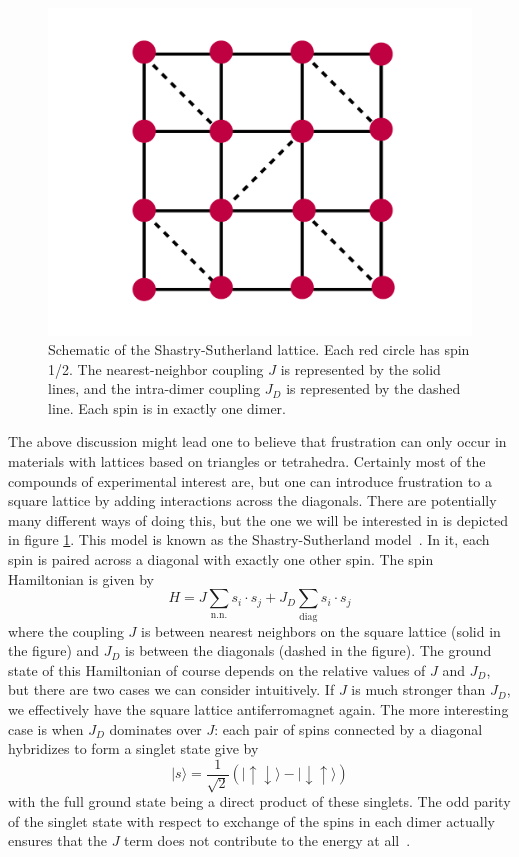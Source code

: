 \documentclass{thesis-umich}
\begin{document}
\begin{figure}
	\caption[The Shastry-Sutherland lattice]{Schematic of the Shastry-Sutherland lattice. Each red circle has spin 1/2. The nearest-neighbor coupling $J$ is represented by the solid lines, and the intra-dimer coupling $J_D$ is represented by the dashed line. Each spin is in exactly one dimer.}
	\label{fig:shastry-sutherland}
	\includegraphics[width=\columnwidth]{figures/ss-model.pdf}
\end{figure}

The above discussion might lead one to believe that frustration can only occur in materials with lattices based on triangles or tetrahedra. Certainly most of the compounds of experimental interest are, but one can introduce frustration to a square lattice by adding interactions across the diagonals. There are potentially many different ways of doing this, but the one we will be interested in is depicted in figure \ref{fig:shastry-sutherland}. This model is known as the Shastry-Sutherland model~\cite{Kageyama2005}. In it, each spin is paired across a diagonal with exactly one other spin. The spin Hamiltonian is given by
\[H = J \sum_{\mathrm{n.n.}}s_i \cdot s_j + J_D\sum_{\mathrm{diag}}s_i \cdot s_j\]
where the coupling $J$ is between nearest neighbors on the square lattice (solid in the figure) and $J_D$ is between the diagonals (dashed in the figure). The ground state of this Hamiltonian of course depends on the relative values of $J$ and $J_D$, but there are two cases we can consider intuitively. If $J$ is much stronger than $J_D$, we effectively have the square lattice antiferromagnet again. The more interesting case is when $J_D$ dominates over $J$: each pair of spins connected by a diagonal hybridizes to form a singlet state give by
\[ | s \rangle = \frac{1}{\sqrt{2}}(|\uparrow \downarrow \rangle - | \downarrow \uparrow \rangle) \]
with the full ground state being a direct product of these singlets. The odd parity of the singlet state with respect to exchange of the spins in each dimer actually ensures that the $J$ term does not contribute to the energy at all~\cite{Miyahara1999}. 
\end{document}
